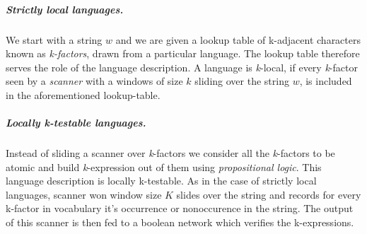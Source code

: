 \subparagraph{Strictly local languages.} We start with a string $w$ and we are given a lookup table of k-adjacent characters known as \textit{k-factors}, drawn from a particular language. The lookup table therefore serves the role of the language description. A language is \textit{k}-local, if every \textit{k}-factor seen by a \textit{scanner} with a windows of size $k$ sliding over the string $w$, is included in the aforementioned lookup-table.  

\subparagraph{Locally k-testable languages.} Instead of sliding a scanner over \textit{k}-factors we consider all the \textit{k}-factors to be atomic and build \textit{k}-expression out of them using \textit{propositional logic}. This language description is locally k-testable. As in the case of strictly local languages, scanner won window size $K$ slides over the string and records for every k-factor in vocabulary it's occurrence or nonoccurence in the string. The output of this scanner is then fed to a boolean network which verifies the k-expressions.



